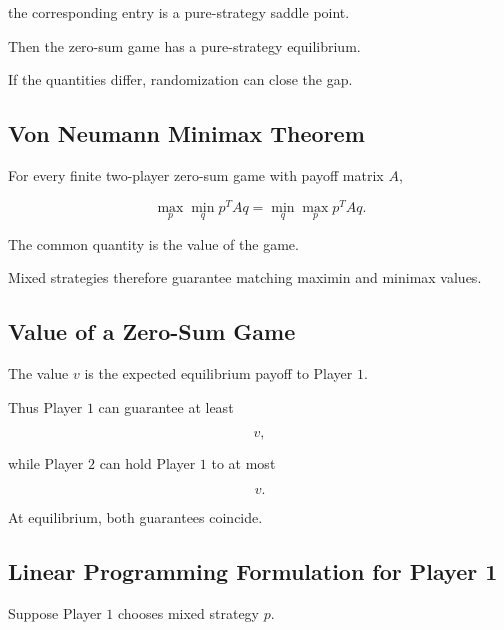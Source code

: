 the corresponding entry is a pure-strategy saddle point.

Then the zero-sum game has a pure-strategy equilibrium.

If the quantities differ, randomization can close the gap.

\subsection{Von Neumann Minimax Theorem}
\label{subsec:minimax-theorem}

\begin{theorem}
For every finite two-player zero-sum game with payoff matrix \(A\),

\[
\boxed{
\max_{p}
\min_{q}
p^TAq
=
\min_{q}
\max_{p}
p^TAq.
}
\]

The common quantity is the value of the game.
\end{theorem}

Mixed strategies therefore guarantee matching maximin and minimax values.

\subsection{Value of a Zero-Sum Game}
\label{subsec:value-zero-sum-game}

The value \(v\) is the expected equilibrium payoff to Player \(1\).

Thus Player \(1\) can guarantee at least

\[
\boxed{
v,
}
\]

while Player \(2\) can hold Player \(1\) to at most

\[
\boxed{
v.
}
\]

At equilibrium, both guarantees coincide.

\subsection{Linear Programming Formulation for Player 1}
\label{subsec:zero-sum-player-one-lp}

Suppose Player \(1\) chooses mixed strategy \(p\).

